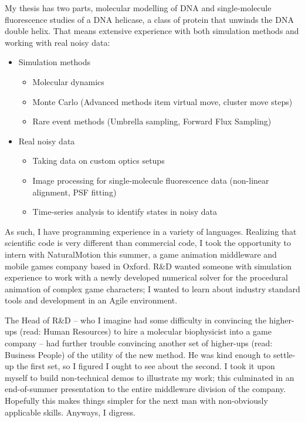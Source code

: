 \documentclass{../res}
\begin{document}
\begin{sloppypar}
\begin{resume}
My thesis has two parts, molecular modelling of DNA and single-molecule fluorescence studies of a DNA helicase, a class of protein that unwinds the DNA double helix. That means extensive experience with both simulation methods and working with real noisy data:
\begin{itemize}[itemindent=1cm]
    \item Simulation methods
        \begin{itemize}[itemindent=1cm]
            \item Molecular dynamics
            \item Monte Carlo (Advanced methods item virtual move, cluster move steps)
            \item Rare event methods (Umbrella sampling, Forward Flux Sampling)
        \end{itemize}
    \item Real noisy data
        \begin{itemize}[itemindent=1cm]
            \item Taking data on custom optics setups
            \item Image processing for single-molecule fluorescence data (non-linear alignment, PSF fitting)
            \item Time-series analysis to identify states in noisy data
        \end{itemize}
\end{itemize}

As such, I have programming experience in a variety of languages. Realizing that scientific code is very different than commercial code, I took the opportunity to intern with NaturalMotion this summer, a game animation middleware and mobile games company based in Oxford. R\&D wanted someone with simulation experience to work with a newly developed numerical solver for the procedural animation of complex game characters; I wanted to learn about industry standard tools and development in an Agile environment. 

The Head of R\&D -- who I imagine had some difficulty in convincing the higher-ups (read: Human Resources) to hire a molecular biophysicist into a game company -- had further trouble convincing another set of higher-ups (read: Business People) of the utility of the new method. He was kind enough to settle-up the first set, so I figured I ought to see about the second. I took it upon myself to build non-technical demos to illustrate my work; this culminated in an end-of-summer presentation to the entire middleware division of the company. Hopefully this makes things simpler for the next man with non-obviously applicable skills. Anyways, I digress.


\end{resume}
\end{sloppypar}
\end{document}
